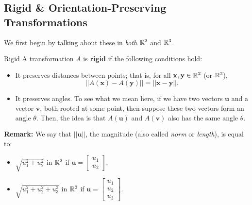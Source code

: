 \documentclass[letterpaper]{article}
\begin{document}
\subsection{Rigid \& Orientation-Preserving Transformations}
We first begin by talking about these in \emph{both} $\mathbb{R}^2$ and $\mathbb{R}^3$. 
\begin{definition}{Rigid}{}
    A transformation $A$ is \textbf{rigid} if the following conditions hold: 
    \begin{itemize}
        \item It preserves distances between points; that is, for all $\mathbf{x}, \mathbf{y} \in \mathbb{R}^2$ (or $\mathbb{R}^3$),
        \[||A(\mathbf{x}) - A(\mathbf{y})|| = ||\mathbf{x} - \mathbf{y}||.\]

        \item It preserves angles. To see what we mean here, if we have two vectors $\mathbf{u}$ and a vector $\mathbf{v}$, both rooted at some point, then suppose these two vectors form an angle $\theta$. Then, the idea is that $A(\mathbf{u})$ and $A(\mathbf{v})$ also has the same angle $\theta$.
    \end{itemize}
\end{definition}
\textbf{Remark:} We say that $||\mathbf{u}||$, the magnitude (also called \emph{norm} or \emph{length}), is equal to:
\begin{itemize}
    \item $\sqrt{u_1^2 + u_2^2}$ in $\mathbb{R}^2$ if $\mathbf{u} = \begin{bmatrix}
        u_1 \\ u_2
    \end{bmatrix}$. 
    \item $\sqrt{u_1^2 + u_2^2 + u_3^3}$ in $\mathbb{R}^3$ if $\mathbf{u} = \begin{bmatrix}
        u_1 \\ u_2 \\ u_3
    \end{bmatrix}$. 
\end{itemize}
\end{document}
